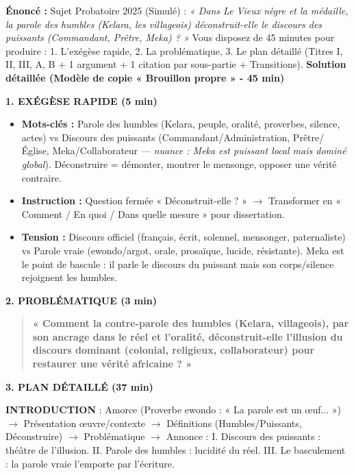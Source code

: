 \documentclass[11pt]{article}
\newcommand{\cle}[1]{{\popxbold\color{popdark}#1}}
\begin{document}
\begin{exoresolu}
\textbf{Énoncé :} Sujet Probatoire 2025 (Simulé) : \emph{« Dans Le Vieux nègre et la médaille, la parole des humbles (Kelara, les villageois) déconstruit-elle le discours des puissants (Commandant, Prêtre, Meka) ? »}
Vous disposez de 45 minutes pour produire : 1. L'exégèse rapide, 2. La problématique, 3. Le plan détaillé (Titres I, II, III, A, B + 1 argument + 1 citation par sous-partie + Transitions).
\tcblower
\textbf{Solution détaillée (Modèle de copie « Brouillon propre » - 45 min)}

\textbf{1. EXÉGÈSE RAPIDE (5 min)}
\begin{itemize}
    \item \textbf{Mots-clés :} \cle{Parole des humbles} (Kelara, peuple, oralité, proverbes, silence, actes) vs \cle{Discours des puissants} (Commandant/Administration, Prêtre/Église, Meka/Collaborateur — \textit{nuance : Meka est puissant local mais dominé global}). \cle{Déconstruire} = démonter, montrer le mensonge, opposer une vérité contraire.
    \item \textbf{Instruction :} Question fermée « Déconstruit-elle ? » $\to$ Transformer en « Comment / En quoi / Dans quelle mesure » pour dissertation.
    \item \textbf{Tension :} Discours officiel (français, écrit, solennel, mensonger, paternaliste) vs Parole vraie (ewondo/argot, orale, prosaïque, lucide, résistante). Meka est le point de bascule : il parle le discours du puissant mais son corps/silence rejoignent les humbles.
\end{itemize}

\textbf{2. PROBLÉMATIQUE (3 min)}
\begin{quote}
\textbf{« Comment la contre-parole des humbles (Kelara, villageois), par son ancrage dans le réel et l'oralité, déconstruit-elle l'illusion du discours dominant (colonial, religieux, collaborateur) pour restaurer une vérité africaine ? »}
\end{quote}

\textbf{3. PLAN DÉTAILLÉ (37 min)}

\textbf{INTRODUCTION} : Amorce (Proverbe ewondo : « La parole est un œuf... ») $\to$ Présentation œuvre/contexte $\to$ Définitions (Humbles/Puissants, Déconstruire) $\to$ Problématique $\to$ Annonce : I. Discours des puissants : théâtre de l'illusion. II. Parole des humbles : lucidité du réel. III. Le basculement : la parole vraie l'emporte par l'écriture.


\end{exoresolu}
\end{document}
